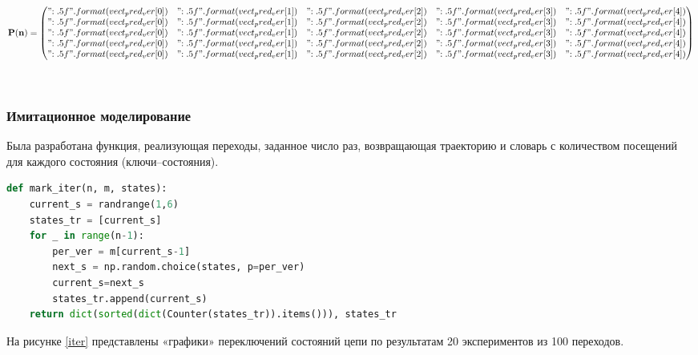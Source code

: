 $$\mathbf{P(n)}=\begin{pmatrix}
{{ "{:.5f}".format(vect_pred_ver[0]) }} & {{ "{:.5f}".format(vect_pred_ver[1]) }} & {{ "{:.5f}".format(vect_pred_ver[2]) }} & {{ "{:.5f}".format(vect_pred_ver[3]) }} & {{ "{:.5f}".format(vect_pred_ver[4]) }}\\
{{ "{:.5f}".format(vect_pred_ver[0]) }} & {{ "{:.5f}".format(vect_pred_ver[1]) }} & {{ "{:.5f}".format(vect_pred_ver[2]) }} & {{ "{:.5f}".format(vect_pred_ver[3]) }} & {{ "{:.5f}".format(vect_pred_ver[4]) }}\\
{{ "{:.5f}".format(vect_pred_ver[0]) }} & {{ "{:.5f}".format(vect_pred_ver[1]) }} & {{ "{:.5f}".format(vect_pred_ver[2]) }} & {{ "{:.5f}".format(vect_pred_ver[3]) }} & {{ "{:.5f}".format(vect_pred_ver[4]) }}\\
{{ "{:.5f}".format(vect_pred_ver[0]) }} & {{ "{:.5f}".format(vect_pred_ver[1]) }} & {{ "{:.5f}".format(vect_pred_ver[2]) }} & {{ "{:.5f}".format(vect_pred_ver[3]) }} & {{ "{:.5f}".format(vect_pred_ver[4]) }}\\
{{ "{:.5f}".format(vect_pred_ver[0]) }} & {{ "{:.5f}".format(vect_pred_ver[1]) }} & {{ "{:.5f}".format(vect_pred_ver[2]) }} & {{ "{:.5f}".format(vect_pred_ver[3]) }} & {{ "{:.5f}".format(vect_pred_ver[4]) }}\\
\end{pmatrix} $$

~\\

\subsubsection{Имитационное моделирование}

Была разработана функция, реализующая переходы, заданное число раз, возвращающая траекторию и словарь с количеством посещений для каждого состояния (ключи--состояния).

\begin{lstlisting}[language=python, label=prog,caption={\textit{реализация марковского процесса}}]
def mark_iter(n, m, states):
    current_s = randrange(1,6)
    states_tr = [current_s]
    for _ in range(n-1):
        per_ver = m[current_s-1]
        next_s = np.random.choice(states, p=per_ver)
        current_s=next_s
        states_tr.append(current_s)
    return dict(sorted(dict(Counter(states_tr)).items())), states_tr
\end{lstlisting}

На рисунке \ref{iter} представлены «графики» переключений состояний цепи по результатам 20 экспериментов из 100 переходов.


